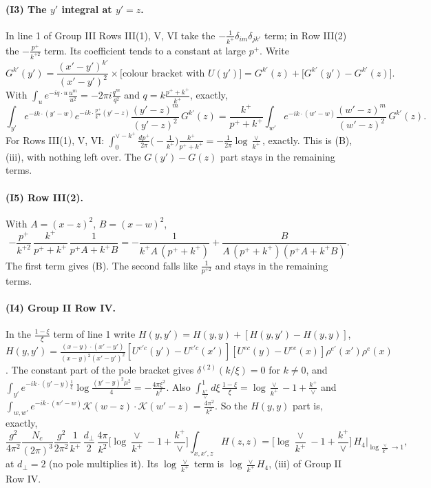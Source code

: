\documentclass[10pt]{article}
\numberwithin{equation}{section}
\begin{document}
\paragraph{(I3) The $y'$ integral at $y'=z$.} In line 1 of Group III Rows III(1), V, VI take the $-\frac{1}{k^+}\delta_{im}\delta_{jk'}$ term; in Row III(2) the $-\frac{p^+}{k^{+2}}$ term. Its coefficient tends to a constant at large $p^+$. Write
\begin{equation*}
G^{k'}(y')=\frac{(x'-y')^{k'}}{(x'-y')^2}\times\big[\text{colour bracket with }U(y')\big]=G^{k'}(z)+\big[G^{k'}(y')-G^{k'}(z)\big].
\end{equation*}
With $\int_u e^{-iq\cdot u}\frac{u^m}{u^2}=-2\pi i\frac{q^m}{q^2}$ and $q=k\frac{p^++k^+}{k^+}$, exactly,
\begin{equation}
\int_{y'}e^{-ik\cdot(y'-w)}e^{-ik\cdot\frac{p^+}{k^+}(y'-z)}\frac{(y'-z)^m}{(y'-z)^2}\,G^{k'}(z)=\frac{k^+}{p^++k^+}\int_{w'}e^{-ik\cdot(w'-w)}\frac{(w'-z)^m}{(w'-z)^2}\,G^{k'}(z).
\label{eq:I3}
\end{equation}
For Rows III(1), V, VI: $\int_0^{\vee-k^+}\frac{dp^+}{2\pi}\big(-\frac{1}{k^+}\big)\frac{k^+}{p^++k^+}=-\frac{1}{2\pi}\log\frac{\vee}{k^+}$, exactly. This is (B), (iii), with nothing left over. The $G(y')-G(z)$ part stays in the remaining terms.

\paragraph{(I5) Row III(2).} With $A=(x-z)^2$, $B=(x-w)^2$,
\begin{equation}
-\frac{p^+}{k^{+2}}\,\frac{k^+}{p^++k^+}\,\frac{1}{p^+A+k^+B}=-\frac{1}{k^+A\,(p^++k^+)}+\frac{B}{A\,(p^++k^+)(p^+A+k^+B)}.
\label{eq:I5}
\end{equation}
The first term gives (B). The second falls like $\frac{1}{p^{+2}}$ and stays in the remaining terms.

\paragraph{(I4) Group II Row IV.} In the $\frac{1-\xi}{\xi}$ term of line 1 write $H(y,y')=H(y,y)+[H(y,y')-H(y,y)]$, $H(y,y')=\frac{(x-y)\cdot(x'-y')}{(x-y)^2(x'-y')^2}[U^{e'c}(y')-U^{e'c}(x')][U^{ec}(y)-U^{ce}(x)]\rho^{e'}(x')\rho^e(x)$. The constant part of the pole bracket gives $\delta^{(2)}(k/\xi)=0$ for $k\neq0$, and $\int_{y'}e^{-ik\cdot(y'-y)\frac{1}{\xi}}\log\frac{(y'-y)^2\mu^2}{4}=-\frac{4\pi\xi^2}{k^2}$. Also $\int_{\frac{k^+}{\vee}}^1d\xi\,\frac{1-\xi}{\xi}=\log\frac{\vee}{k^+}-1+\frac{k^+}{\vee}$ and $\int_{w,w'}e^{-ik\cdot(w'-w)}\mathcal K(w-z)\cdot\mathcal K(w'-z)=\frac{4\pi^2}{k^2}$. So the $H(y,y)$ part is, exactly,
\begin{equation}
\frac{g^2}{4\pi^2}\frac{N_c}{(2\pi)^3}\frac{g^2}{2\pi^2}\frac{1}{k^+}\,\frac{d_\perp}{2}\,\frac{4\pi}{k^2}\Big[\log\frac{\vee}{k^+}-1+\frac{k^+}{\vee}\Big]\int_{x,x',z}H(z,z)
=\Big[\log\frac{\vee}{k^+}-1+\frac{k^+}{\vee}\Big]\,H_4\Big|_{\log\frac{\vee}{k^+}\to1},
\label{eq:I4}
\end{equation}
at $d_\perp=2$ (no pole multiplies it). Its $\log\frac{\vee}{k^+}$ term is $\log\frac{\vee}{k^+}H_4$, (iii) of Group II Row IV.
\end{document}
